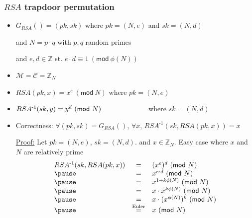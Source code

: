 \documentclass[aspectratio=169, lualatex, 10pt,dvipsnames,svgnames]{beamer} %
\newcommand{\Ccal}{\mathcal{C}}
\newcommand{\Mcal}{\mathcal{M}}
\begin{document}
\begin{frame}
  \frametitle{$RSA$ trapdoor permutation}
  \vspace{-0.4cm}

  \begin{itemize}
  \item $G_{RSA}() = (pk, sk)$ \hfill where $pk=(N, e)$ and $sk=(N,d)$

    \hfill and $N = p\cdot q$ with $p, q$ random primes

    \hfill and $e, d \in \mathbb Z$ st. $e\cdot d \equiv 1\ (\mathsf{mod}\ \phi(N))$
    \smallskip{}
    \pause

  \item $\Mcal = \Ccal = \mathbb Z_N$
   \smallskip{}
    \pause

  \item $RSA(pk, x) = x^e\ (\mathsf{mod}\ N)$ \hfill where $pk=(N,e)$
    \smallskip{}
    \pause

  \item $RSA^{\text{-}1}(sk, y) = y^d\ (\mathsf{mod}\ N) \hspace{2.25cm}$ \hfill where $sk=(N,d)$ 
    \smallskip{}
    \pause

  \item Correctness: $\forall (pk, sk) = G_{RSA}()$, $\forall x$, $RSA^{\text{-1}}(sk, RSA(pk, x)) = x$\medskip
    \pause

    \hspace{-1.0cm}\underline{Proof:} Let $pk = (N, e)$, $sk = (N, d)$. and $x\in\mathbb Z_N$. Easy case where $x$ and $N$ are relatively prime \pause
    \[
    \begin{array}[t]{lcl}
      RSA^{\text{-1}}(sk, RSA(pk, x)) & = & (x^e)^d\ (\mathsf{mod}\ N) \\\pause
                                    & = & x^{e\cdot d}\ (\mathsf{mod}\ N) \\\pause
                                    & = & x^{1 + k\phi(N)}\ (\mathsf{mod}\ N) \\\pause
                                    & = & x\cdot x^{k\phi(N)}\ (\mathsf{mod}\ N) \\\pause
                                    & = & x\cdot (x^{\phi(N)})^k\ (\mathsf{mod}\ N) \\\pause
                                    & \stackrel{\text{Euler}}{=} & x\ (\mathsf{mod}\ N) \\
    \end{array}
    \]
  \end{itemize}
\end{frame}
\end{document}
